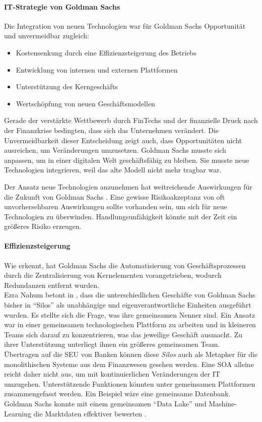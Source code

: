 \paragraph{IT-Strategie von Goldman Sachs}
Die Integration von neuen Technologien war für Goldman Sachs Opportunität und unvermeidbar \cite{Gupta:2017} zugleich:
\begin{itemize}
    \item Kostensenkung durch eine Effizienzsteigerung des Betriebs
    \item Entwicklung von internen und externen Plattformen
    \item Unterstützung des Kerngeschäfts
    \item Wertschöpfung von neuen Geschäftsmodellen
\end{itemize}

Gerade der verstärkte Wettbewerb durch FinTechs und der finanzielle Druck nach der Finanzkrise bedingten, dass sich das Unternehmen verändert. Die Unvermeidbarkeit dieser Entscheidung zeigt auch, dass Opportunitäten nicht ausreichen, um Veränderungen umzusetzen. Goldman Sachs musste sich anpassen, um in einer digitalen Welt geschäftsfähig zu bleiben. Sie musste neue Technologien integrieren, weil das alte Modell nicht mehr tragbar war.

Der Ansatz neue Technologien anzunehmen hat weitreichende Auswirkungen für die Zukunft von Goldman Sachs \cite{Gupta:2017}. Eine gewisse Risikoakzeptanz von oft unvorhersehbaren Auswirkungen sollte vorhanden sein, um sich für neue Technologien zu überwinden. Handlungsunfähigkeit könnte mit der Zeit ein größeres Risiko erzeugen. 

\paragraph{Effizienzsteigerung}
\label{par:effizienzsteig}
Wie \citet{Gupta:2017} erkennt, hat Goldman Sachs die Automatisierung von Geschäftsprozessen durch die Zentralisierung von Kernelementen vorangetrieben, wodurch Redundanzen entfernt wurden. 
\medskip
\\
Ezra Nahum betont in \cite[Zitat, S.5]{Gupta:2017}, dass die unterschiedlichen Geschäfte von Goldman Sachs bisher in \enquote{Silos} als unabhängige und eigenverantwortliche Einheiten ausgeführt wurden. Es stellte sich die Frage, was ihre gemeinsamen Nenner sind. Ein Ansatz war in einer gemeinsamen technologischen Plattform zu arbeiten und in kleineren Teams sich darauf zu konzentrieren, was das jeweilige Geschäft ausmacht. Zu ihrer Unterstützung unterliegt ihnen ein größeres gemeinsamen Team.
\medskip
\\
Übertragen auf die \ac{SEU} von Banken können diese \emph{Silos} \cite{Gupta:2017} auch als Metapher für die monolithischen Systeme \cite{Bussmann2006} aus dem Finanzwesen gesehen werden. Eine \ac{SOA} alleine reicht daher nicht aus, um mit kontinuierlichen Veränderungen der IT umzugehen. Unterstützende Funktionen könnten unter gemeinsamen Plattformen zusammengefasst werden. Ein Beispiel wäre eine gemeinsame Datenbank. Goldman Sachs konnte mit einem gemeinsamen \enquote{Data Lake} und Mashine-Learning die Marktdaten effektiver bewerten \cite{Gupta:2017}.

